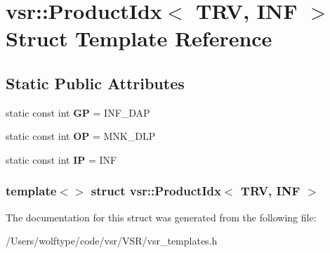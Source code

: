 \hypertarget{structvsr_1_1_product_idx_3_01_t_r_v_00_01_i_n_f_01_4}{\section{vsr\-:\-:Product\-Idx$<$ T\-R\-V, I\-N\-F $>$ Struct Template Reference}
\label{structvsr_1_1_product_idx_3_01_t_r_v_00_01_i_n_f_01_4}
}
\subsection*{Static Public Attributes}
\begin{DoxyCompactItemize}
\item 
\hypertarget{structvsr_1_1_product_idx_3_01_t_r_v_00_01_i_n_f_01_4_afe68f9a3fb4fd2329e9c6bcea70f17e5}{static const int {\bfseries G\-P} = I\-N\-F\-\_\-\-D\-A\-P}\label{structvsr_1_1_product_idx_3_01_t_r_v_00_01_i_n_f_01_4_afe68f9a3fb4fd2329e9c6bcea70f17e5}

\item 
\hypertarget{structvsr_1_1_product_idx_3_01_t_r_v_00_01_i_n_f_01_4_a6e17008cdd848c651ddcf83b8b2a3ab9}{static const int {\bfseries O\-P} = M\-N\-K\-\_\-\-D\-L\-P}\label{structvsr_1_1_product_idx_3_01_t_r_v_00_01_i_n_f_01_4_a6e17008cdd848c651ddcf83b8b2a3ab9}

\item 
\hypertarget{structvsr_1_1_product_idx_3_01_t_r_v_00_01_i_n_f_01_4_a92d65491faf9abbdc1a63fe5f5ede522}{static const int {\bfseries I\-P} = I\-N\-F}\label{structvsr_1_1_product_idx_3_01_t_r_v_00_01_i_n_f_01_4_a92d65491faf9abbdc1a63fe5f5ede522}

\end{DoxyCompactItemize}
\subsubsection*{template$<$$>$ struct vsr\-::\-Product\-Idx$<$ T\-R\-V, I\-N\-F $>$}



The documentation for this struct was generated from the following file\-:\begin{DoxyCompactItemize}
\item 
/\-Users/wolftype/code/vsr/\-V\-S\-R/vsr\-\_\-templates.\-h\end{DoxyCompactItemize}
